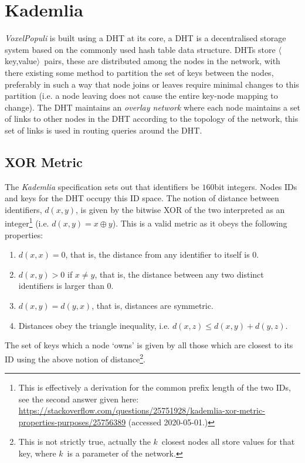 \documentclass[12pt,notitlepage,a4paper]{report}
\newcommand{\kademlia}{\emph{Kademlia}}
\newcommand{\K}{$k$}
\newcommand{\voxpop}{\emph{VoxelPopuli}}
\begin{document}
	\section{Kademlia}
	\voxpop{} is built using a DHT at its core, a DHT is a decentralised storage system based on the commonly used hash table data structure. DHTs store $\langle$ key,value$\rangle$~pairs, these are distributed among the nodes in the network, with there existing some method to partition the set of keys between the nodes, preferably in such a way that node joins or leaves require minimal changes to this partition (i.e. a node leaving does not cause the entire key-node mapping to change). The DHT maintains an \emph{overlay network} where each node maintains a set of links to other nodes in the DHT according to the topology of the network, this set of links is used in routing queries around the DHT.
	
	\subsection{XOR Metric}
	The \kademlia{} specification sets out that identifiers be $160$bit integers. Nodes IDs and keys for the DHT occupy this ID space. The notion of distance between identifiers, $d(x,y)$, is given by the bitwise XOR of the two interpreted as an integer\footnote{This is effectively a derivation for the common prefix length of the two IDs, see the second answer given here: \url{https://stackoverflow.com/questions/25751928/kademlia-xor-metric-properties-purposes/25756389} (accessed 2020-05-01.)} (i.e. $d(x,y) = x \oplus y$). This is a valid metric as it obeys the following properties:
	\begin{enumerate}
		\item $d(x,x) = 0$, that is, the distance from any identifier to itself is $0$.
		\item $d(x,y) > 0$ if $x \neq y$, that is, the  distance between any two distinct identifiers is larger than $0$.
		\item $d(x,y) = d(y,x)$, that is, distances are symmetric.
		\item Distances obey  the triangle inequality, i.e. $d(x,z) \leq d(x,y) + d(y,z)$.
	\end{enumerate}
	The set of keys which a node `owns' is given by all those which are closest to its ID using the above notion of distance\footnote{This is not strictly true, actually the \K~closest nodes all store values for that key, where \K~is a parameter of the network.}.
	
\end{document}
